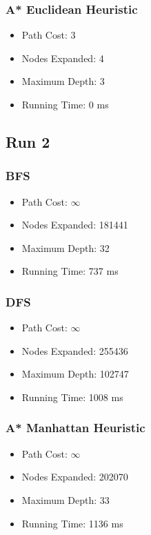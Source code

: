 \documentclass{article}
\begin{document}
		\subsubsection{A* Euclidean Heuristic}
			\begin{itemize}
				\item Path Cost: 3
				\item Nodes Expanded: 4
				\item Maximum Depth: 3
				\item Running Time: 0 ms
			\end{itemize}

	\subsection{Run 2}
		\begin{center}
		   \end{center}
		\subsubsection{BFS}
			\begin{itemize}
				\item Path Cost: $\infty$
				\item Nodes Expanded: 181441
				\item Maximum Depth: 32
				\item Running Time: 737 ms
			\end{itemize}
		\subsubsection{DFS}
			\begin{itemize}
				\item Path Cost: $\infty$
				\item Nodes Expanded: 255436
				\item Maximum Depth: 102747
				\item Running Time: 1008 ms
			\end{itemize}	
		\subsubsection{A* Manhattan Heuristic}
			\begin{itemize}
				\item Path Cost: $\infty$
				\item Nodes Expanded: 202070
				\item Maximum Depth: 33
				\item Running Time: 1136 ms
			\end{itemize}
\end{document}
